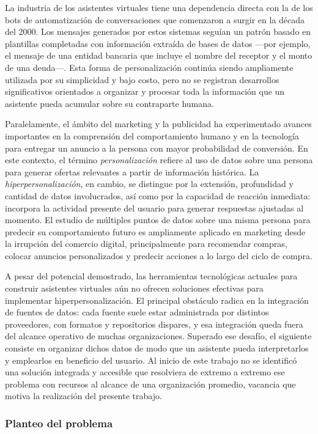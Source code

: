 La industria de los asistentes virtuales tiene una dependencia directa con la de los bots de automatización de conversaciones que comenzaron a surgir en la década del 2000. Los mensajes generados por estos sistemas seguían un patrón basado en plantillas completadas con información extraída de bases de datos —por ejemplo, el mensaje de una entidad bancaria que incluye el nombre del receptor y el monto de una deuda—. Esta forma de personalización continúa siendo ampliamente utilizada por su simplicidad y bajo costo, pero no se registran desarrollos significativos orientados a organizar y procesar toda la información que un asistente pueda acumular sobre su contraparte humana.

Paralelamente, el ámbito del marketing y la publicidad ha experimentado avances importantes en la comprensión del comportamiento humano y en la tecnología para entregar un anuncio a la persona con mayor probabilidad de conversión. En este contexto, el término \textit{personalización} refiere al uso de datos sobre una persona para generar ofertas relevantes a partir de información histórica. La \textit{hiperpersonalización}, en cambio, se distingue por la extensión, profundidad y cantidad de datos involucrados, así como por la capacidad de reacción inmediata: incorpora la actividad presente del usuario para generar respuestas ajustadas al momento. El estudio de múltiples puntos de datos sobre una misma persona para predecir su comportamiento futuro es ampliamente aplicado en marketing desde la irrupción del comercio digital, principalmente para recomendar compras, colocar anuncios personalizados y predecir acciones a lo largo del ciclo de compra.

A pesar del potencial demostrado, las herramientas tecnológicas actuales para construir asistentes virtuales aún no ofrecen soluciones efectivas para implementar hiperpersonalización. El principal obstáculo radica en la integración de fuentes de datos: cada fuente suele estar administrada por distintos proveedores, con formatos y repositorios dispares, y esa integración queda fuera del alcance operativo de muchas organizaciones. Superado ese desafío, el siguiente consiste en organizar dichos datos de modo que un asistente pueda interpretarlos y emplearlos en beneficio del usuario. Al inicio de este trabajo no se identificó una solución integrada y accesible que resolviera de extremo a extremo ese problema con recursos al alcance de una organización promedio, vacancia que motiva la realización del presente trabajo.

\subsubsection{Planteo del problema}

